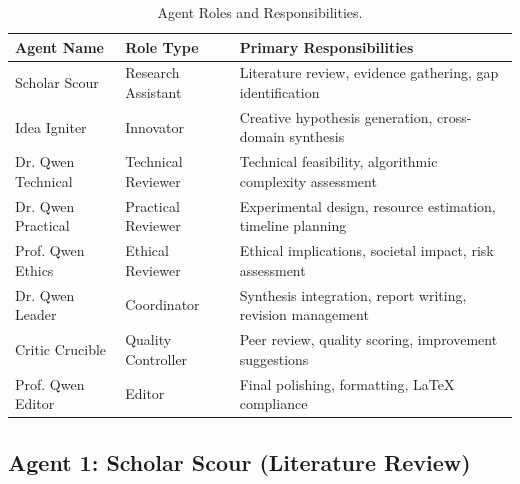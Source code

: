 \documentclass[runningheads]{llncs}
\begin{document}
\begin{table}[h]
\centering
\small
\begin{tabular}{llp{6cm}}
\toprule
\textbf{Agent Name} & \textbf{Role Type} & \textbf{Primary Responsibilities} \\
\midrule
Scholar Scour & Research Assistant & Literature review, evidence gathering, gap identification \\
Idea Igniter & Innovator & Creative hypothesis generation, cross-domain synthesis \\
Dr. Qwen Technical & Technical Reviewer & Technical feasibility, algorithmic complexity assessment \\
Dr. Qwen Practical & Practical Reviewer & Experimental design, resource estimation, timeline planning \\
Prof. Qwen Ethics & Ethical Reviewer & Ethical implications, societal impact, risk assessment \\
Dr. Qwen Leader & Coordinator & Synthesis integration, report writing, revision management \\
Critic Crucible & Quality Controller & Peer review, quality scoring, improvement suggestions \\
Prof. Qwen Editor & Editor & Final polishing, formatting, LaTeX compliance \\
\bottomrule
\end{tabular}
\caption{Agent Roles and Responsibilities.}
\label{tab:agent_roles}
\end{table}

\subsection{Agent 1: Scholar Scour (Literature Review)}
\end{document}

